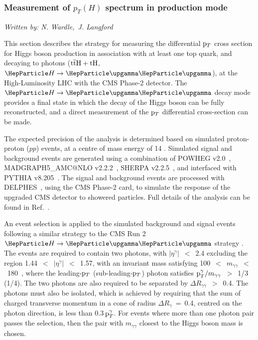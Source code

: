 \subsubsection{Measurement of $p_{T}(H)$ spectrum  in \ttH production mode}
\label{sec:ttHdiffxs}

\begin{center}{\it Written by: N. Wardle,~J. Langford} \end{center}

This section describes the strategy for measuring the differential $\mathrm{p}_{T}$ cross section for 
Higgs boson production in association with at least one top quark, and decaying to photons ($\text{t}\overline{\text{t}}\text{H}+\text{tH}$, $\hgg$), 
at the High-Luminosity LHC with the CMS Phase-2 detector. The $\hgg$ decay mode provides a final state in which the decay of the Higgs boson can be fully reconstructed, and a direct measurement of the $\mathrm{p}_{T}$ differential cross-section can be made. 

The expected precision of the analysis is determined based on simulated proton-proton ($pp$) events, at a centre of mass energy of 14 \UTeV.
Simulated signal and background events are generated using a combination of {\sc POWHEG}
v2.0~\cite{Alioli:2010xd,Nason:2009ai}, {\sc MADGRAPH5\_AMC@NLO} v2.2.2~\cite{Alwall:2014hca}, {\sc SHERPA} v2.2.5~\cite{Gleisberg:2008ta}, and interfaced with {\sc PYTHIA} v8.205~\cite{Sjostrand:2007gs}. The signal and background events are processed with {\sc DELPHES}~\cite{deFavereau:2013fsa}, using the CMS Phase-2 card, to simulate the response of the upgraded CMS detector to showered particles. Full details of the analysis can be found in Ref.~\cite{CMS-PAS-FTR-18-020}.


An event selection is applied to the simulated background and signal events following a similar strategy to the CMS Run 2 $\hgg$ strategy \cite{Sirunyan:2018ouh}. The events are required to contain two photons, with $|\eta^\gamma|$~$<$~2.4 excluding the region 1.44~$<$~$|\eta^\gamma|$~$<$~1.57, with an invariant mass satisfying 100~$<$~$m_{\gamma\gamma}$~$<$~180~\UGeV, where the leading-$\mathrm{p}_{T}$ (sub-leading-$\mathrm{p}_{T}$) photon satisfies $\mathrm{p}_{T}^{\gamma}/m_{\gamma\gamma}$~$>$~1/3 (1/4). The two photons are also required to be separated by $\Delta R_{\gamma\gamma}$~$>$~0.4. The photons must also be isolated, which is achieved by requiring that the sum of charged transverse momentum in a cone of radius $\Delta R_{\gamma}$~=~0.4, centred on the photon direction, is less than 0.3$\, \mathrm{p}_{T}^\gamma$. For events where more than one photon pair passes the selection, then the pair with $m_{\gamma\gamma}$ closest to the Higgs boson mass is chosen.

